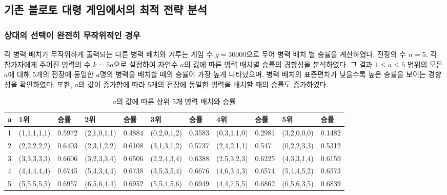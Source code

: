 \subsection{기존 블로토 대령 게임에서의 최적 전략 분석}
\subsubsection{상대의 선택이 완전히 무작위적인 경우}
각 병력 배치가 무작위하게 출력되는 다른 병력 배치와 겨루는 게임 수 $g=30000$으로 두어 병력 배치 별 승률을 계산하였다. 전장의 수 $n=5$, 각 참가자에게 주어진 병력의 수 $k=5a$으로 설정하여 자연수 $a$의 값에 따른 병력 배치별 승률의 경향성을 분석하였다. 그 결과 $1 \leq a \leq 5$ 범위의 모든 $a$에 대해 5개의 전장에 동일한 $a$명의 병력을 배치할 때의 승률이 가장 높게 나타났으며, 병력 배치의 표준편차가 낮을수록 높은 승률을 보이는 경향성을 확인하였다. 또한, $a$의 값이 증가함에 따라 5개의 전장에 동일한 병력을 배치할 때의 승률도 증가하였다.
\\
\begin{table}[htb]
    \centering
    \caption{$a$의 값에 따른 상위 5개 병력 배치와 승률}
    {\scriptsize
    \begin{tabular}{l|ll|ll|ll|ll|ll}
    a  & 1위          & 승률      & 2위          & 승률      & 3위          & 승률      & 4위          & 승률      & 5위            & 승률      \\ \hline
    1  & (1,1,1,1,1) & 0.5972  & (2,1,0,1,1) & 0.4884  & (0,2,0,1,2) & 0.3583  & (0,3,1,1,0) & 0.2981  & (3,2,0,0,0)   & 0.1482  \\
    2  & (2,2,2,2,2) & 0.6403  & (2,3,1,2,2) & 0.6108  & (3,1,3,1,2) & 0.5737  & (2,4,2,1,1) & 0.547   & (0,2,2,3,3)   & 0.5312  \\
    3  & (3,3,3,3,3) & 0.6606  & (3,2,3,3,4) & 0.6506  & (2,2,4,3,4) & 0.6388  & (2,5,3,2,3) & 0.6225  & (4,3,3,1,4)   & 0.6159  \\
    4  & (4,4,4,4,4) & 0.6745  & (5,4,3,4,4) & 0.6738  & (3,5,3,5,4) & 0.6676  & (4,6,3,4,3) & 0.6574  & (5,4,4,5,2)   & 0.6573  \\
    5  & (5,5,5,5,5) & 0.6957  & (6,5,6,4,4) & 0.6952  & (5,5,4,5,6) & 0.6949  & (4,4,7,5,5) & 0.6862  & (6,5,6,3,5)   & 0.6839  \\
    \end{tabular}
    }
    \label{tab:my_label}
\end{table}
